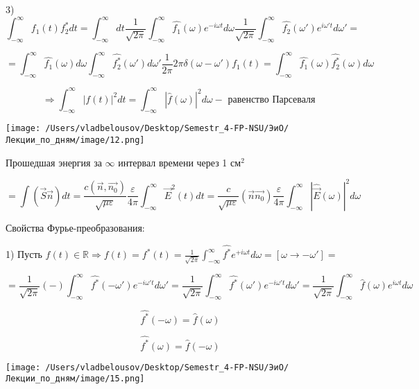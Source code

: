 \documentclass[12pt, a4paper]{report}
\begin{document}
3) \[ \int_{-\infty}^{\infty}   f_1 ( t)f_2 ^{*}dt  = \int_{-\infty}^{\infty}   dt \frac{1}{\sqrt{2\pi}}\int_{-\infty}^{\infty} \hat{f_1 }(\omega)e ^{-i \omega t} d \omega \frac{1}{\sqrt{2 \pi}} \int _{-\infty}^{\infty} \hat{f_2 }(\omega') e^{i \omega' t} d \omega'    = \]

\[ = \int_{-\infty}^{\infty}    \hat{f_1} (\omega)d \omega  \int_{-\infty}^{\infty} \hat{f_2 ^{*} }(\omega') d \omega' \frac{1}{2 \pi} 2\pi \delta ( \omega -\omega') f_1(t)= \int_{-\infty }^{\infty}\hat{f_1 }(\omega) \hat{f_2 ^{*} }(\omega) d \omega  \]

\[ \Rightarrow \int_{-\infty}^{\infty} |f(t)| ^2 dt = \int  _{-\infty}^{\infty} |\hat{f}(\omega)| ^2 d \omega - \text{ равенство Парсеваля }   \] 

\begin{center}
    \texttt{[image: /Users/vladbelousov/Desktop/Semestr\_4-FP-NSU/ЭиО/Лекции\_по\_дням/image/12.png]}
\end{center}

Прошедшая энергия за \( \infty \)  интервал времени через 1 см\( ^2 \)

\[ = \int (\vec{S}\vec{n})dt= \frac{c (\vec{n},\vec{n_0})}{\sqrt{\mu \varepsilon}} \frac{\varepsilon}{ 4\pi }  \int_{-\infty}^{\infty} \vec{E} ^2(t)dt = \frac{c}{\sqrt{\mu \varepsilon}} ( \vec{n}\vec{n_0}) \frac{\varepsilon}{4 \pi} \int_{-\infty}^{\infty} |\hat{\vec{E}}(\omega) | ^2 d \omega  \] 

Свойства Фурье-преобразования: 

1) Пусть \( \displaystyle f(t) \in  \mathbb{R} \Rightarrow f(t)= f^*(t)= \frac{1}{\sqrt{2\pi}}\int_{-\infty}^{\infty} \hat{f^{*} }e ^{+i \omega t} d \omega =[\omega \to  - \omega ']   =  \)

\[ =\frac{1}{\sqrt{ 2 \pi }}(- )\int_{-\infty}^{\infty}  \hat{f^{*} } ( -\omega ')e^{- i \omega' t} d \omega '= \frac{1}{\sqrt{2 \pi}} \int_{-\infty}^{\infty} \hat{f^{*} } ( \omega ')e^{- i \omega' t} d \omega'   = \frac{1}{\sqrt{2 \pi}} \int_{-\infty}^{\infty} \hat{f } ( \omega )e^{i \omega t } d \omega   \] 

\[ \hat{f^*} (- \omega) = \hat{f}(\omega)  \]

\[ \hat{f^*} ( \omega) = \hat{f}(-\omega) \] 

\begin{center}
    \texttt{[image: /Users/vladbelousov/Desktop/Semestr\_4-FP-NSU/ЭиО/Лекции\_по\_дням/image/15.png]}
\end{center}
\end{document}
